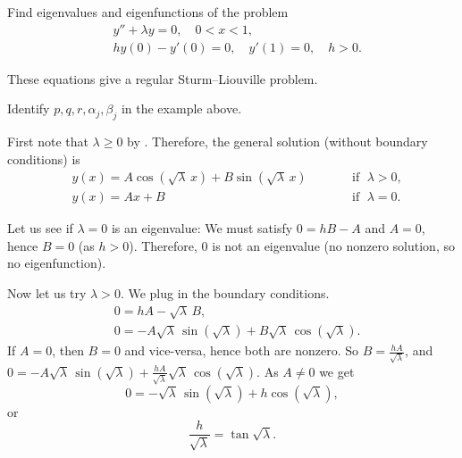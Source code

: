 \begin{example}
Find eigenvalues and eigenfunctions of the problem
\begin{align*}
& y''+\lambda y = 0, \quad 0 < x < 1 , \\
& hy(0)- y'(0) = 0, \quad y'(1)  = 0, \quad h > 0.
\end{align*}

These equations give a regular Sturm--Liouville problem.

\begin{exercise}
Identify $p, q, r, \alpha_j, \beta_j$ in the example above.
\end{exercise}

First note that
$\lambda \geq 0$ by .
Therefore, the general solution (without boundary conditions) is
\begin{equation*}
\begin{aligned}
 & y(x) = A \cos ( \sqrt{\lambda}\, x) + B \sin (
\sqrt{\lambda}\, x) & & \qquad \text{if } \; \lambda > 0 , \\
& y(x) = A x + B & & \qquad \text{if } \; \lambda = 0 .
\end{aligned}
\end{equation*}

Let us see if $\lambda = 0$ is an eigenvalue:
We must satisfy $0 = hB - A$ and $A = 0$, hence $B=0$ (as $h > 0$).
Therefore, 0 is not an eigenvalue (no nonzero solution, so no eigenfunction).

Now let us
try $\lambda > 0$.  We plug in the boundary conditions.
\begin{align*}
& 0 = h A - \sqrt{\lambda}\, B , \\
& 0 = -A \sqrt{\lambda}\, \sin (\sqrt{\lambda}) +B \sqrt{\lambda}\,
\cos (\sqrt{\lambda}) .
\end{align*}
If $A=0$, then $B=0$ and vice-versa, hence both are nonzero.
So $B = \frac{hA}{\sqrt{\lambda}}$, and
$0 = -A \sqrt{\lambda}\, \sin ( \sqrt{\lambda}) + \frac{hA}{\sqrt{\lambda}}
\sqrt{\lambda}\, \cos ( \sqrt{\lambda})$.  As $A \not= 0$ we get
\begin{equation*}
0 = 
- \sqrt{\lambda}\, \sin ( \sqrt{\lambda}) + h \cos ( \sqrt{\lambda}) ,
\end{equation*}
or
\begin{equation*}
\frac{h}{\sqrt{\lambda}} = \tan \sqrt{\lambda} .
\end{equation*}


\end{example}
